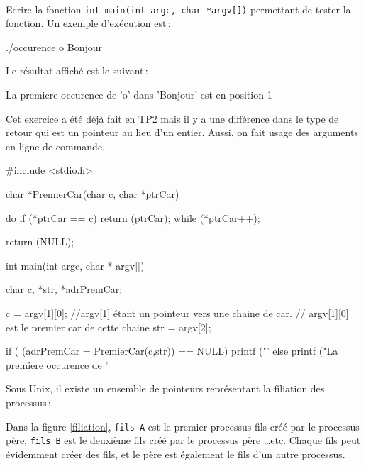 \documentclass[10pt]{article}\usepackage[nu]{esial}
\begin{document}

~\\
Ecrire la fonction {\tt int main(int argc, char *argv[])} permettant
de tester la fonction. Un exemple d'exécution est\,:

\medskip

\begin{boxedverbatim}
./occurence  o Bonjour
\end{boxedverbatim}

\medskip

Le résultat affiché est le suivant\,:

\medskip

\begin{boxedverbatim}
La premiere occurence de 'o' dans 'Bonjour' est en position 1
\end{boxedverbatim}

\begin{Reponse}
  Cet exercice a été déjà fait en TP2 mais il y a une différence dans
  le type de retour qui est un pointeur au lieu d'un entier. Aussi, on
  fait usage des arguments en ligne de commande.

\begin{boxedverbatim}
#include <stdio.h>

char *PremierCar(char c, char *ptrCar){
  do
    if (*ptrCar == c)
      return (ptrCar);
  while (*ptrCar++);

  return (NULL);
}

int main(int argc, char * argv[]){

  char c, *str, *adrPremCar;

  c = argv[1][0]; //argv[1] étant un pointeur vers une chaine de car.
                  // argv[1][0] est le premier car de cette chaine
  str = argv[2];

  if ( (adrPremCar = PremierCar(c,str)) == NULL) 
    printf ("'%
  else
    printf ("La premiere occurence de '%
}
\end{boxedverbatim}
\end{Reponse}
    



\bigskip\bigskip{}

Sous Unix, il existe un ensemble de pointeurs représentant la
filiation des  processus\,: 

Dans la figure \ref{filiation}, {\tt fils A} est le premier processus
fils créé par le processus père, {\tt fils B} est le deuxième fils
créé par le processus père \ldots etc.
Chaque fils peut évidemment créer des fils, et le père est également le
fils d'un autre processus.
\end{document}
